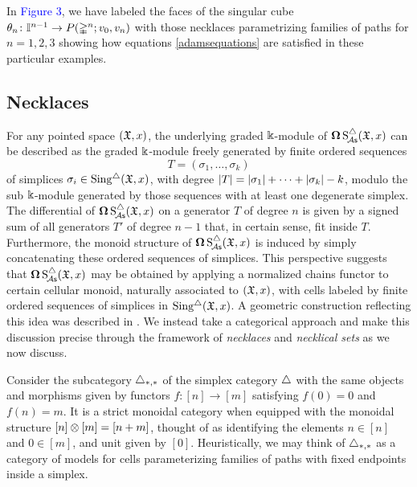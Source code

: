 In \textcolor{blue}{Figure 3}, we have labeled the faces of the singular cube
$\theta_n \colon \mathbb{I}^{n-1} \to P(\mathbb{\Delta}^n;v_0,v_n)$ with those necklaces parametrizing families of paths for $n=1,2,3$ showing how equations \ref{adamsequations} are satisfied in these particular examples. 

\subsection{Necklaces}

For any pointed space $(\mathfrak{X},x)$, the underlying graded $\Bbbk$-module of $\operatorname{\mathbf{\Omega}} \operatorname{S^{\triangle}_{\!{\mathcal{A}\mathsf{s}}}}(\mathfrak{X},x)$ can be described as the graded $\Bbbk$-module freely generated by finite ordered sequences
\[
T = (\sigma_1, \dots, \sigma_k)
\]
of simplices $\sigma_i \in \operatorname{Sing^{\triangle}}(\mathfrak{X},x)$, with degree $\lvert T\rvert = \lvert\sigma_1\rvert+\dots+\lvert\sigma_k\rvert - k$, modulo the sub $\Bbbk$-module generated by those sequences with at least one degenerate simplex.
The differential of $\operatorname{\mathbf{\Omega}} \operatorname{S^{\triangle}_{\!{\mathcal{A}\mathsf{s}}}}(\mathfrak{X},x)$ on a generator $T$ of degree $n$ is given by a signed sum of all generators $T'$ of degree $n-1$ that, in certain sense, fit inside $T$.
Furthermore, the monoid structure of $\operatorname{\mathbf{\Omega}} \operatorname{S^{\triangle}_{\!{\mathcal{A}\mathsf{s}}}}(\mathfrak{X},x)$ is induced by simply concatenating these ordered sequences of simplices.
This perspective suggests that $\operatorname{\mathbf{\Omega}} \operatorname{S^{\triangle}_{\!{\mathcal{A}\mathsf{s}}}}(\mathfrak{X},x)$ may be obtained by applying a normalized chains functor to certain cellular monoid, naturally associated to $(\mathfrak{X},x)$, with cells labeled by finite ordered sequences of simplices in $\operatorname{Sing^{\triangle}}(\mathfrak{X},x)$.
A geometric construction reflecting this idea was described in \cite{baues1980geometry}.
We instead take a categorical approach and make this discussion precise through the framework of \textit{necklaces} and \textit{necklical sets} as we now discuss.

Consider the subcategory $\triangle_{*,*}$ of the simplex category $\triangle$ with the same objects and morphisms given by functors $f \colon [n] \to [m]$ satisfying $f(0) = 0$ and $f(n) = m$.
It is a strict monoidal category when equipped with the monoidal structure $[n] \otimes [m] = [n+m]$, thought of as identifying the elements $n \in [n]$ and $0 \in [m]$, and unit given by $[0]$.
Heuristically, we may think of $\triangle_{*,*}$ as a category of models for cells parameterizing families of paths with fixed endpoints inside a simplex.


